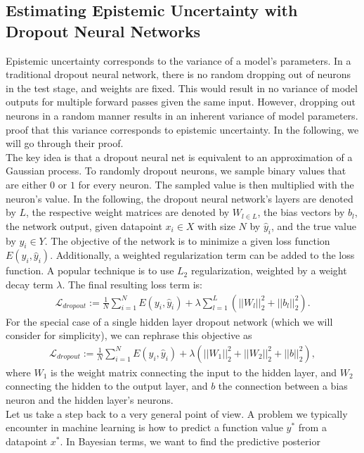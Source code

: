 \documentclass[a4paper,cleardoubleempty,BCOR1cm, 11pt]{report}
\begin{document}
\subsection{Estimating Epistemic Uncertainty with Dropout Neural Networks}\label{sec:dropoutuncertainty}
Epistemic uncertainty corresponds to the variance of a model's parameters.
In a traditional dropout neural network, there is no random dropping out of neurons in the test stage, and weights are fixed. This would result in no variance of model outputs for multiple forward passes given the same input. However, dropping out neurons in a random manner results in an inherent variance of model parameters. \citet{gal2016dropout} proof that this variance corresponds to epistemic uncertainty. In the following, we will go through their proof.\\
The key idea is that a dropout neural net is equivalent to an approximation of a Gaussian process. To randomly dropout neurons, we sample binary values that are either $0$ or $1$ for every neuron. The sampled value is then multiplied with the neuron's value.
In the following, the dropout neural network's layers are denoted by $L$, the respective weight matrices are denoted by $W_{l \in L}$, the bias vectors by $b_l$, the network output, given datapoint $x_i \in X$ with size $N$ by $\hat{y}_i$, and the true value by $y_i \in Y$. The objective of the network is to minimize a given loss function $E(y_i, \hat{y}_i)$. Additionally, a weighted regularization term can be added to the loss function. A popular technique is to use $L_2$ regularization, weighted by a weight decay term $\lambda$. The final resulting loss term is:
\begin{align*}
\mathcal{L}_{dropout} := \frac{1}{N}\sum_{i=1}^{N}E(y_i, \hat{y}_i) + \lambda \sum_{l=1}^{L}(||W_l||^2_2 + ||b_l||^2_2).
\end{align*}
For the special case of a single hidden layer dropout network (which we will consider for simplicity), we can rephrase this objective as
\begin{align}\label{eq:dropout}
\mathcal{L}_{dropout} := \frac{1}{N}\sum_{i=1}^{N}E(y_i, \hat{y}_i) + \lambda (||W_1||^2_2 + ||W_2||^2_2+ ||b||^2_2),
\end{align} where $W_1$ is the weight matrix connecting the input to the hidden layer, and $W_2$ connecting the hidden to the output layer, and $b$ the connection between a bias neuron and the hidden layer's neurons.\\
Let us take a step back to a very general point of view. A problem we typically encounter in machine learning is how to predict a function value $y^*$ from a datapoint $x^*$. In Bayesian terms, we want to find the predictive posterior
\end{document}
